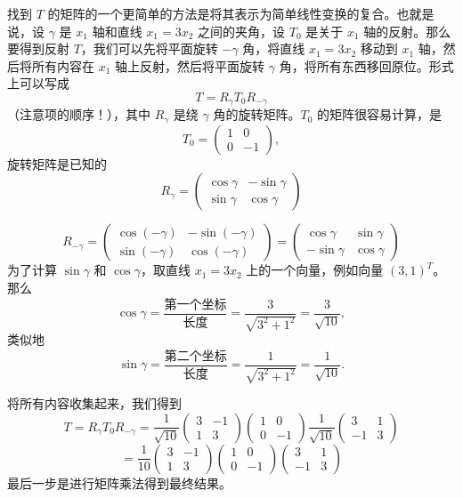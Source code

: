 找到 $T$ 的矩阵的一个更简单的方法是将其表示为简单线性变换的复合。也就是说，设 $\gamma$ 是 $x_1$ 轴和直线 $x_1 = 3x_2$ 之间的夹角，设 $T_0$ 是关于 $x_1$ 轴的反射。那么要得到反射 $T$，我们可以先将平面旋转 $-\gamma$ 角，将直线 $x_1 = 3x_2$ 移动到 $x_1$ 轴，然后将所有内容在 $x_1$ 轴上反射，然后将平面旋转 $\gamma$ 角，将所有东西移回原位。形式上可以写成 
$$T = R_\gamma T_0 R_{-\gamma}$$
（注意项的顺序！），其中 $R_\gamma$ 是绕 $\gamma$ 角的旋转矩阵。$T_0$ 的矩阵很容易计算，是 
$$T_0 = \begin{pmatrix} 1 & 0 \\ 0 & -1 \end{pmatrix},$$
旋转矩阵是已知的 
$$R_\gamma = \begin{pmatrix} \cos \gamma & -\sin \gamma \\ \sin \gamma & \cos \gamma \end{pmatrix}$$

$$R_{-\gamma} = \begin{pmatrix} \cos(-\gamma) & -\sin(-\gamma) \\ \sin(-\gamma) & \cos(-\gamma) \end{pmatrix} = \begin{pmatrix} \cos \gamma & \sin \gamma \\ -\sin \gamma & \cos \gamma \end{pmatrix}$$
为了计算 $\sin \gamma$ 和 $\cos \gamma$，取直线 $x_1 = 3x_2$ 上的一个向量，例如向量 $(3, 1)^T$。那么 
$$\cos \gamma = \frac{\text{第一个坐标}}{\text{长度}} = \frac{3}{\sqrt{3^2 + 1^2}} = \frac{3}{\sqrt{10}},$$
类似地 
$$\sin \gamma = \frac{\text{第二个坐标}}{\text{长度}} = \frac{1}{\sqrt{3^2 + 1^2}} = \frac{1}{\sqrt{10}}.$$

将所有内容收集起来，我们得到
$$T = R_\gamma T_0 R_{-\gamma} = \frac{1}{\sqrt{10}} \begin{pmatrix} 3 & -1 \\ 1 & 3 \end{pmatrix} \begin{pmatrix} 1 & 0 \\ 0 & -1 \end{pmatrix} \frac{1}{\sqrt{10}} \begin{pmatrix} 3 & 1 \\ -1 & 3 \end{pmatrix} $$
$$= \frac{1}{10} \begin{pmatrix} 3 & -1 \\ 1 & 3 \end{pmatrix} \begin{pmatrix} 1 & 0 \\ 0 & -1 \end{pmatrix} \begin{pmatrix} 3 & 1 \\ -1 & 3 \end{pmatrix}$$
最后一步是进行矩阵乘法得到最终结果。


